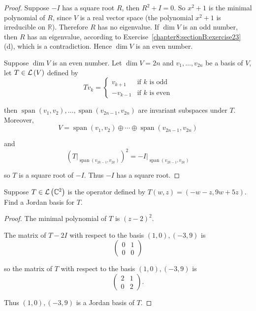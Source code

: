 \begin{proof}
    Suppose $-I$ has a square root $R$, then $R^{2} + I = 0$. So $x^{2} + 1$ is the minimal polynomial of $R$, since $V$ is a real vector space (the polynomial $x^{2} + 1$ is irreducible on $\mathbb{R}$). Therefore $R$ has no eigenvalue. If $\dim V$ is an odd number, then $R$ has an eigenvalue, according to Exercise~\ref{chapter8:sectionB:exercise23} (d), which is a contradiction. Hence $\dim V$ is an even number.

    Suppose $\dim V$ is an even number. Let $\dim V = 2n$ and $v_{1}, \ldots, v_{2n}$ be a basis of $V$, let $T\in\mathcal{L}\left({V}\right)$ defined by
    \[
        Tv_{k} = \begin{cases}
            v_{k+1}  & \text{if $k$ is odd}  \\
            -v_{k-1} & \text{if $k$ is even}
        \end{cases}
    \]

    then $\operatorname{span}(v_{1}, v_{2}), \ldots, \operatorname{span}(v_{2n-1}, v_{2n})$ are invariant subspaces under $T$. Moreover,
    \[
        V = \operatorname{span}(v_{1}, v_{2})\oplus\cdots\oplus\operatorname{span}(v_{2n-1}, v_{2n})
    \]

    and
    \[
        {(T\vert_{\operatorname{span}(v_{2k-1}, v_{2k})})}^{2} = -I\vert_{\operatorname{span}(v_{2k-1}, v_{2k})}
    \]

    so $T$ is a square root of $-I$. Thus $-I$ has a square root.
\end{proof}
\newpage

\begin{exercise}\label{chapter8:sectionC:exercise5}
    Suppose $T\in\mathcal{L}\left({\mathbb{C}^{2}}\right)$ is the operator defined by $T(w, z) = (-w-z, 9w+5z)$. Find a Jordan basis for $T$.
\end{exercise}

\begin{proof}
    The minimal polynomial of $T$ is ${(z - 2)}^{2}$.

    The matrix of $T - 2I$ with respect to the basis $(1, 0), (-3, 9)$ is
    \[
        \begin{pmatrix}
            0 & 1 \\
            0 & 0
        \end{pmatrix}
    \]

    so the matrix of $T$ with respect to the basis $(1, 0), (-3, 9)$ is
    \[
        \begin{pmatrix}
            2 & 1 \\
            0 & 2
        \end{pmatrix}.
    \]

    Thus $(1, 0), (-3, 9)$ is a Jordan basis of $T$.
\end{proof}
\newpage

